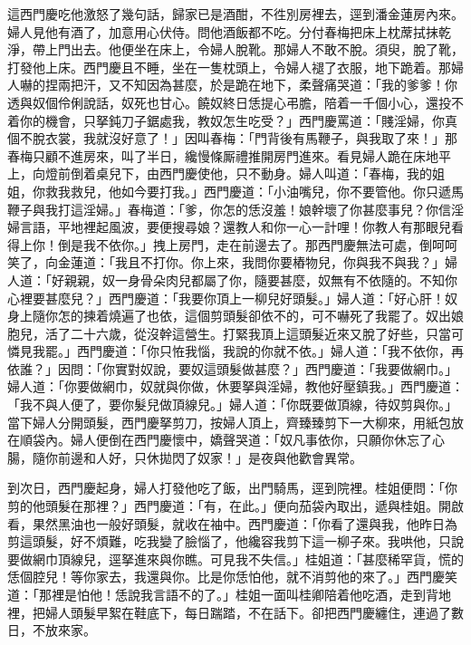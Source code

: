 這西門慶吃他激怒了幾句話，歸家已是酒酣，不徃別房裡去，逕到潘金蓮房內來。婦人見他有酒了，加意用心伏侍。問他酒飯都不吃。分付春梅把床上枕蓆拭抹乾淨，帶上門出去。他便坐在床上，令婦人脫靴。那婦人不敢不脫。須臾，脫了靴，打發他上床。西門慶且不睡，坐在一隻枕頭上，令婦人褪了衣服，地下跪着。{}那婦人嚇的捏兩把汗，又不知因為甚麼，於是跪在地下，柔聲痛哭道：「我的爹爹！你透與奴個伶俐說話，奴死也甘心。饒奴終日恁提心弔膽，陪着一千個小心，還投不着你的機會，只拏鈍刀子鋸處我，教奴怎生吃受？」西門慶罵道：「賤淫婦，你真個不脫衣裳，我就沒好意了！」因叫春梅：「門背後有馬鞭子，與我取了來！」{}那春梅只顧不進房來，叫了半日，纔慢條厮禮{}推開房門進來。看見婦人跪在床地平上，向燈前倒着桌兒下，由西門慶使他，只不動身。婦人叫道：「春梅，我的姐姐，你救我救兒，他如今要打我。」西門慶道：「小油嘴兒，你不要管他。你只遞馬鞭子與我打這淫婦。」{}春梅道：「爹，你怎的恁沒羞！娘幹壞了你甚麼事兒？你信淫婦言語，平地裡起風波，要便搜尋娘？還教人和你一心一計哩！你教人有那眼兒看得上你！倒是我不依你。」拽上房門，走在前邊去了。那西門慶無法可處，倒呵呵笑了，{}向金蓮道：「我且不打你。你上來，我問你要樁物兒，你與我不與我？」{}婦人道：「好親親，奴一身骨朵肉兒都屬了你，{}隨要甚麼，奴無有不依隨的。不知你心裡要甚麼兒？」西門慶道：「我要你頂上一柳兒好頭髮。」婦人道：「好心肝！奴身上隨你怎的揀着燒遍了也依，這個剪頭髮卻依不的，可不嚇死了我罷了。奴出娘胞兒，活了二十六歲，從沒幹這營生。打緊我頂上這頭髮近來又脫了好些，{}只當可憐見我罷。」西門慶道：「你只恠我惱，我說的你就不依。」婦人道：「我不依你，再依誰？」因問：「你實對奴說，要奴這頭髮做甚麼？」西門慶道：「我要做網巾。」婦人道：「你要做網巾，奴就與你做，休要拏與淫婦，教他好壓鎮我。」西門慶道：「我不與人便了，要你髮兒做頂線兒。」婦人道：「你既要做頂線，待奴剪與你。」當下婦人分開頭髮，西門慶拏剪刀，按婦人頂上，齊臻臻剪下一大柳來，用紙包放在順袋內。{}婦人便倒在西門慶懷中，嬌聲哭道：「奴凡事依你，只願你休忘了心腸，隨你前邊和人好，只休拋閃了奴家！」是夜與他歡會異常。

到次日，西門慶起身，婦人打發他吃了飯，出門騎馬，逕到院裡。桂姐便問：「你剪的他頭髮在那裡？」西門慶道：「有，在此。」便向茄袋內取出，遞與桂姐。開啟看，果然黑油也一般好頭髮，{}就收在袖中。西門慶道：「你看了還與我，他昨日為剪這頭髮，好不煩難，吃我變了臉惱了，他纔容我剪下這一柳子來。我哄他，只說要做網巾頂線兒，逕拏進來與你瞧。可見我不失信。」桂姐道：「甚麼稀罕貨，慌的恁個腔兒！等你家去，我還與你。比是你恁怕他，就不消剪他的來了。」{}西門慶笑道：「那裡是怕他！恁說我言語不的了。」桂姐一面叫桂卿陪着他吃酒，走到背地裡，把婦人頭髮早絮在鞋底下，每日踹踏，{}不在話下。卻把西門慶纏住，連過了數日，不放來家。

